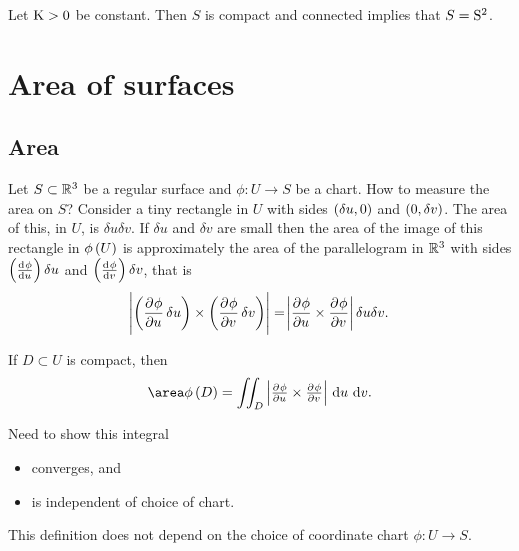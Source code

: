 \begin{corollary}
Let $ \K > 0 $ be constant. Then $ S $ is compact and connected implies that $ S = \S^2 $.
\end{corollary}

\pagebreak

\section{Area of surfaces}

\subsection{Area}


Let $ S \subset \RR^3 $ be a regular surface and $ \phi : U \to S $ be a chart. How to measure the area on $ S $? Consider a tiny rectangle in $ U $ with sides $ \br{\delta u, 0} $ and $ \br{0, \delta v} $. The area of this, in $ U $, is $ \delta u\delta v $. If $ \delta u $ and $ \delta v $ are small then the area of the image of this rectangle in $ \phi\br{U} $ is approximately the area of the parallelogram in $ \RR^3 $ with sides $ \br{\tod{\phi}{u}}\delta u $ and $ \br{\tod{\phi}{v}}\delta v $, that is
$$ \abs{\br{\dpd{\phi}{u}\delta u} \times \br{\dpd{\phi}{v}\delta v}} = \abs{\dpd{\phi}{u} \times \dpd{\phi}{v}}\delta u\delta v. $$

\begin{definition}
If $ D \subset U $ is compact, then
$$ \area \phi\br{D} = \iintd{D}{\abs{\tpd{\phi}{u} \times \tpd{\phi}{v}}}{u}{v}. $$
\end{definition}

Need to show this integral
\begin{itemize}
\item converges, and
\item is independent of choice of chart.
\end{itemize}

\begin{proposition}
This definition does not depend on the choice of coordinate chart $ \phi : U \to S $.
\end{proposition}

